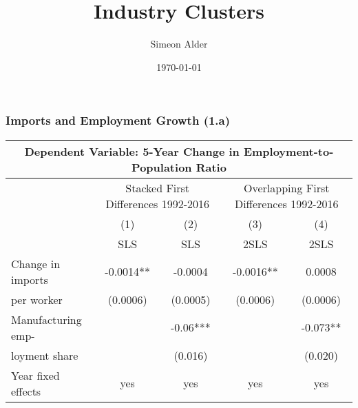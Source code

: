 \documentclass[11pt]{beamer}
\title{Industry Clusters}
\author[shortname]{Simeon Alder\inst{1}}
\institute[shortinst]{\inst{1} U of Wisconsin--Madison}
\date{\today}
\begin{document}
\begin{frame}
\titlepage
\end{frame}

\begin{frame}
\frametitle{Imports and Employment Growth (1.a)}
\begin{table}
  \centering 
    {\tiny
    \begin{tabularx}{1\textwidth}{@{\extracolsep{\stretch{1}}} lcccc}
    \toprule
    \multicolumn{5}{c}{Dependent Variable: 5-Year Change in Employment-to-Population Ratio} \\
    \midrule
    & \multicolumn{2}{c}{Stacked First Differences 1992-2016}  & \multicolumn{2}{c}{Overlapping First Differences 1992-2016}\\
        \cmidrule{2-3} \cmidrule{4-5}    
    & (1) & (2) & (3) & (4)  \\
    & SLS & SLS & 2SLS & 2SLS  \\
    \midrule
Change in imports &  -0.0014**& -0.0004 & -0.0016** & 0.0008  \\
per worker	     &  (0.0006) & (0.0005) & (0.0006) & (0.0006)  \\
\midrule
Manufacturing emp- & & -0.06*** & & -0.073** \\
loyment share & & (0.016) & & (0.020) \\
\midrule
 Year fixed effects & yes & yes & yes & yes  \\
 \bottomrule
    \end{tabularx}}
\end{table}
\end{frame}
\end{document}
